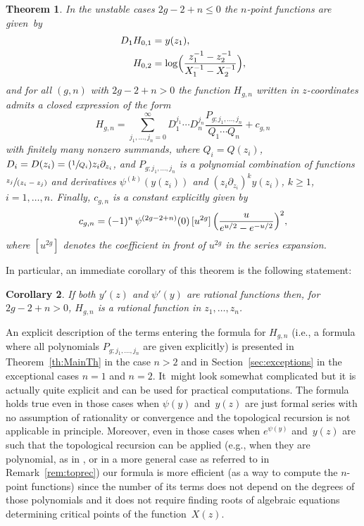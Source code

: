 \documentclass[11pt]{article}
\newcommand{\ie}{i.e.,\xspace}
\newcommand{\eg}{e.g.,\xspace}
\newcommand{\Psfrac}[2]{(\sfrac{#1}{#2})}
\newcommand{\spfrac}[2]{\sfrac{#1}{(#2)}}
\theoremstyle{plain}
\newtheorem{theorem}{Theorem}[section]
\newtheorem{corollary}[theorem]{Corollary}
\theoremstyle{definition}
\theoremstyle{remark}
\begin{document}
\begin{theorem}\label{th:intro}
In the unstable cases $2g-2+n\le0$ the $n$-point functions are given~by
\begin{align}
D_1 H_{0,1}&=y(z_1), \notag%
\\
H_{0,2}&=\log\Bigl(\frac{z_1^{-1}-z_2^{-1}}{X_1^{-1}-X_2^{-1}}\Bigr),\label{eq:H02}
\end{align}
and for all $(g,n)$ with $2g-2+n>0$ the function $H_{g,n}$ written in $z$-coordinates admits a closed expression of the form
\begin{equation}\label{eqTh1}
H_{g,n}=\sum_{j_1,\dots,j_n = 0}^\infty D_1^{j_1}\cdots D_n^{j_n}
\frac{P_{g;j_1,\dots,j_n}}{Q_1\cdots Q_n}+c_{g,n}
\end{equation}
with finitely many nonzero summands, where $Q_i=Q(z_i)$, $D_i=D(z_i)=\Psfrac1{Q_i}z_i\partial_{z_i}$, and $P_{g;j_1,\dots,j_n}$ is a polynomial combination of functions
$\spfrac{z_j}{z_i-z_j}$ and
derivatives $\psi^{(k)}(y(z_i))$ and
$\left(z_i\partial_{z_i}\right)^ky(z_i)$, $k\ge1$, $i=1,\dots, n$.
Finally, $c_{g,n}$ is a constant explicitly given by
\begin{equation*}
c_{g,n}=(-1)^n\,\psi^{(2g-2+n)}(0)\,[u^{2g}]\,\Bigl(\frac{u}{e^{u/2}-e^{-u/2}}\Bigr)^2,
\end{equation*}
where $[u^{2g}]$ denotes the coefficient in front of $u^{2g}$ in the series expansion.
\end{theorem}

In particular, an immediate corollary of this theorem is the following statement:

\begin{corollary}\mbox{}\hspace*{-2mm}
If both $y'(z)$ and $\psi'(y)$ are rational functions then, for \hbox{$2g\!-\!2\!+\!n\!>\!0$}, $H_{g,n}$ is a rational function in $z_1,\dots,z_n$.
\end{corollary}

An explicit description of the terms entering the formula for $H_{g,n}$ (\ie a formula where all polynomials $P_{g;j_1,\dots,j_n}$ are given explicitly) is presented in Theorem~\ref{th:MainTh} in the case $n>2$ and in Section~\ref{sec:exceptions} in the exceptional cases $n=1$ and $n=2$. It~might look somewhat complicated but it is actually quite explicit and can be used for practical computations. The formula holds true even in those cases when $\psi(y)$ and~$y(z)$ are just formal series with no assumption of rationality or convergence and the topological recursion is not applicable in principle. Moreover, even in those cases when $e^{\psi(y)}$ and~$y(z)$ are such that
the topological recursion can be applied (\eg when they are polynomial, as in \cite{ACEH-1,ACEH-2}, or in a more general case as referred to in Remark~\ref{rem:toprec}) our formula is more efficient (as a way to compute the $n$-point functions) since the number of its terms does not depend on the degrees of those polynomials and it does not require finding roots of algebraic equations determining critical points of the function~$X(z)$.
\end{document}
